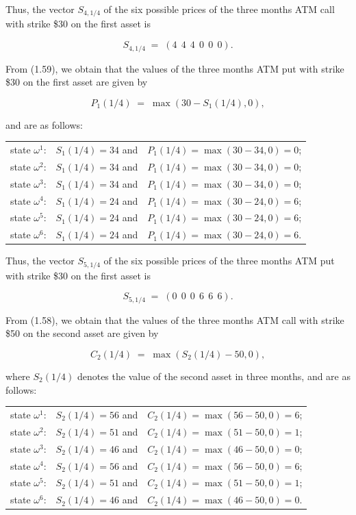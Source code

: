 Thus, the vector $S_{4,1/4}$ of the six possible prices of the three months
ATM call with strike \$30 on the first asset is

\begin{equation}
S_{4,1/4} \;=\; (4\ \ 4\ \ 4\ \ 0\ \ 0\ \ 0).
\end{equation}

From (1.59), we obtain that the values of the three months ATM put with
strike \$30 on the first asset are given by

\[
P_1(1/4) \;=\; \max(30-S_1(1/4),0),
\]

and are as follows:

\begin{center}
\begin{tabular}{lll}
state $\omega^1$: & $S_1(1/4)=34$ and & $P_1(1/4)=\max(30-34,0)=0$; \\
state $\omega^2$: & $S_1(1/4)=34$ and & $P_1(1/4)=\max(30-34,0)=0$; \\
state $\omega^3$: & $S_1(1/4)=34$ and & $P_1(1/4)=\max(30-34,0)=0$; \\
state $\omega^4$: & $S_1(1/4)=24$ and & $P_1(1/4)=\max(30-24,0)=6$; \\
state $\omega^5$: & $S_1(1/4)=24$ and & $P_1(1/4)=\max(30-24,0)=6$; \\
state $\omega^6$: & $S_1(1/4)=24$ and & $P_1(1/4)=\max(30-24,0)=6$. \\
\end{tabular}
\end{center}

Thus, the vector $S_{5,1/4}$ of the six possible prices of the three months
ATM put with strike \$30 on the first asset is

\begin{equation}
S_{5,1/4} \;=\; (0\ \ 0\ \ 0\ \ 6\ \ 6\ \ 6).
\end{equation}

From (1.58), we obtain that the values of the three months ATM call with
strike \$50 on the second asset are given by

\[
C_2(1/4) \;=\; \max(S_2(1/4)-50,0),
\]

where $S_2(1/4)$ denotes the value of the second asset in three months, and
are as follows:

\begin{center}
\begin{tabular}{lll}
state $\omega^1$: & $S_2(1/4)=56$ and & $C_2(1/4)=\max(56-50,0)=6$; \\
state $\omega^2$: & $S_2(1/4)=51$ and & $C_2(1/4)=\max(51-50,0)=1$; \\
state $\omega^3$: & $S_2(1/4)=46$ and & $C_2(1/4)=\max(46-50,0)=0$; \\
state $\omega^4$: & $S_2(1/4)=56$ and & $C_2(1/4)=\max(56-50,0)=6$; \\
state $\omega^5$: & $S_2(1/4)=51$ and & $C_2(1/4)=\max(51-50,0)=1$; \\
state $\omega^6$: & $S_2(1/4)=46$ and & $C_2(1/4)=\max(46-50,0)=0$. \\
\end{tabular}
\end{center}

